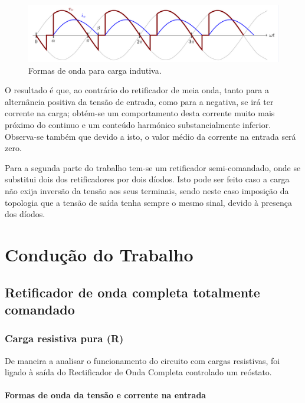 \documentclass[a4paper,11pt]{article}
\numberwithin{equation}{section}
\begin{document}
\begin{figure}[h]
	\centering
	\includegraphics[keepaspectratio=true, scale=0.8]{img/andamento}
	\caption{Formas de onda para carga indutiva.}
	\label{fig:andamento}
	\vspace{-0.8em}
\end{figure}

O resultado é que, ao contrário do retificador de meia onda, tanto para a alternância positiva da tensão de entrada, como para a negativa, se irá ter corrente na carga; obtém-se um comportamento desta corrente muito mais próximo do continuo e um conteúdo harmónico substancialmente inferior. Observa-se também que devido a isto, o valor médio da corrente na entrada será zero.

Para a segunda parte do trabalho tem-se um retificador semi-comandado, onde se substitui dois dos retificadores por dois díodos. Isto pode ser feito caso a carga não exija inversão da tensão aos seus terminais, sendo neste caso imposição da topologia que a tensão de saída tenha sempre o mesmo sinal, devido à presença dos díodos.


\section{Condução do Trabalho}

\subsection{Retificador de onda completa totalmente comandado}


\subsubsection{Carga resistiva pura (R)}

De maneira a analisar o funcionamento do circuito com cargas resistivas, foi ligado à saída do Rectificador de Onda Completa controlado um reóstato.


\paragraph{Formas de onda da tensão e corrente na entrada} \mbox{}\
\end{document}
